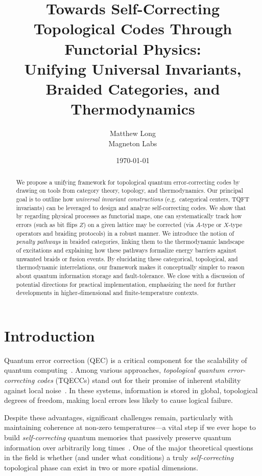 \documentclass[12pt]{article}
\title{\textbf{Towards Self-Correcting Topological Codes Through Functorial Physics:\\
Unifying Universal Invariants, Braided Categories, and Thermodynamics}}
\author{Matthew Long \\
Magneton Labs}
\date{\today}
\begin{document}
\maketitle

\begin{abstract}
We propose a unifying framework for topological quantum error-correcting codes by drawing on tools from category theory, topology, and thermodynamics. Our principal goal is to outline how \emph{universal invariant constructions} (e.g.\ categorical centers, TQFT invariants) can be leveraged to design and analyze self-correcting codes. We show that by regarding physical processes as functorial maps, one can systematically track how errors (such as bit flips $Z$) on a given lattice may be corrected (via $A$-type or $X$-type operators and braiding protocols) in a robust manner. We introduce the notion of \emph{penalty pathways} in braided categories, linking them to the thermodynamic landscape of excitations and explaining how these pathways formalize energy barriers against unwanted braids or fusion events. By elucidating these categorical, topological, and thermodynamic interrelations, our framework makes it conceptually simpler to reason about quantum information storage and fault-tolerance. We close with a discussion of potential directions for practical implementation, emphasizing the need for further developments in higher-dimensional and finite-temperature contexts.
\end{abstract}

\tableofcontents

\section{Introduction}\label{sec:intro}
Quantum error correction (QEC) is a critical component for the scalability of quantum computing~\cite{kitaev2003fault, dennis2002topological}. Among various approaches, \emph{topological quantum error-correcting codes} (TQECCs) stand out for their promise of inherent stability against local noise~\cite{freedman2003topological, fowler2012surface}. In these systems, information is stored in global, topological degrees of freedom, making local errors less likely to cause logical failure. 

Despite these advantages, significant challenges remain, particularly with maintaining coherence at non-zero temperatures---a vital step if we ever hope to build \emph{self-correcting} quantum memories that passively preserve quantum information over arbitrarily long times~\cite{brown2020quantum}. One of the major theoretical questions in the field is whether (and under what conditions) a truly \emph{self-correcting} topological phase can exist in two or more spatial dimensions.
\end{document}
